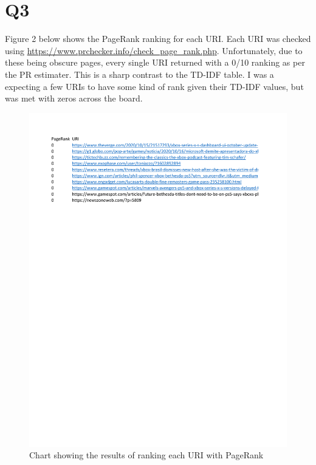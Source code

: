 \documentclass[12pt]{article}
\begin{document}
\section*{Q3}

Figure 2 below shows the PageRank ranking for each URI. Each URI was checked using \url{https://www.prchecker.info/check_page_rank.php}. Unfortunately, due to these being obscure pages, every single URI returned with a 0/10 ranking as per the PR estimater. This is a sharp contrast to the TD-IDF table. I was a expecting a few URIs to have some kind of rank given their TD-IDF values, but was met with zeros across the board.

\begin{figure}[H]
            \centering
            \includegraphics[trim = 0 20cm {0.31\textwidth} 2cm, clip]{PageRank_Table.pdf}
            \caption{Chart showing the results of ranking each URI with PageRank}
            \label{fig:my_label}
        \end{figure}
\end{document}
